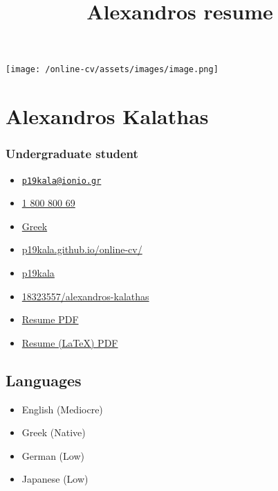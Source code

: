 \documentclass[]{article}
\title{Alexandros resume}
\date{}
\providecommand{\tightlist}{%
  \setlength{\itemsep}{0pt}\setlength{\parskip}{0pt}}
\begin{document}
\maketitle

\texttt{[image: /online-cv/assets/images/image.png]}

\section{Alexandros Kalathas}\label{alexandros-kalathas}

\subsubsection{Undergraduate student}\label{undergraduate-student}

\begin{itemize}
\tightlist
\item
  \emph{} \href{mailto:p19kala@ionio.gr}{\nolinkurl{p19kala@ionio.gr}}
\item
  \emph{} \href{tel:1\%20800\%20800\%2069}{1 800 800 69}
\item
  \emph{} \href{}{Greek}
\item
  \emph{}
  \href{http://p19kala.github.io/online-cv/}{p19kala.github.io/online-cv/}
\item
  \emph{} \href{http://github.com/p19kala}{p19kala}
\item
  \emph{}
  \href{https://stackoverflow.com/users/18323557/alexandros-kalathas}{18323557/alexandros-kalathas}
\item
  \emph{}
  \href{https://raw.githubusercontent.com/p19kala/online-cv/gh-pages/assets/pdf/Alexandros-resume.pdf}{Resume
  PDF}
\item
  \emph{}
  \href{https://raw.githubusercontent.com/p19kala/online-cv/gh-pages/assets/pdf/cv.pdf}{Resume
  (LaTeX) PDF}
\end{itemize}

\subsection{Languages}\label{languages}

\begin{itemize}
\tightlist
\item
  English {(Mediocre)}
\item
  Greek {(Native)}
\item
  German {(Low)}
\item
  Japanese {(Low)}
\end{itemize}
\end{document}
